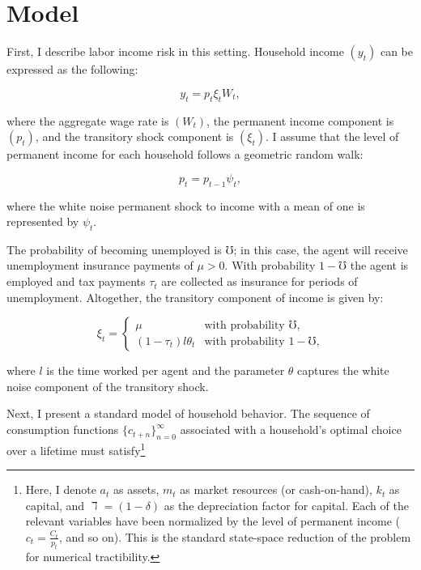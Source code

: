 \documentclass[\econtexRoot/Chp1proposal]{subfiles}
\begin{document}
\onlyinsubfile{\setcounter{section}{2}}
\section{Model}
\notinsubfile{\label{sec:Model}}

\par First, I describe labor income risk in this setting. Household income $(y_t)$ can be expressed as the following:

$$ y_t = p_t \xi_t W_t, $$

where the aggregate wage rate is $(W_t)$, the permanent income component is $(p_t)$, and the transitory shock component is $(\xi_t)$. I assume that the level of permanent income for each household follows a geometric random walk:

$$ p_t = p_{t-1} \psi_{t}, $$

where the white noise permanent shock to income with a mean of one is represented by $\psi_t$.

\par The probability of becoming unemployed is $\mho$; in this case, the agent will receive unemployment insurance payments of $\mu > 0$. With probability $1 - \mho$ the agent is employed and tax payments $\tau_t$ are collected as insurance for periods of unemployment. Altogether, the transitory component of income is given by:

\begin{equation*}
\xi_t =
    \begin{cases}
        \mu & \text{with probability $\mho$,} \\
        (1-\tau_t) l \theta_t & \text{with probability $1-\mho$,}
    \end{cases}
\end{equation*}

where $l$ is the time worked per agent and the parameter $\theta$ captures the white noise component of the transitory shock.

\par Next, I present a standard model of household behavior. The sequence of consumption functions $\{c_{t+n}\}^{\infty}_{n=0}$ associated with a household's optimal choice over a lifetime must satisfy\footnote{Here, I denote $a_t$ as assets, $m_t$ as market resources (or cash-on-hand), $k_t$ as capital, and $\daleth = (1 - \delta)$ as the depreciation factor for capital. Each of the relevant variables have been normalized by the level of permanent income ($c_t = \frac{C_t}{p_t}$, and so on). This is the standard state-space reduction of the problem for numerical tractibility.} 
\end{document}
